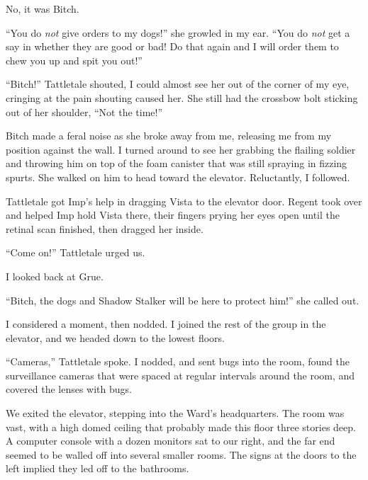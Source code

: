 No, it was Bitch.



``You do \emph{not} give orders to my dogs!'' she growled in my ear.  ``You do \emph{not} get a say in whether they are good or bad!  Do that again and I will order them to chew you up and spit you out!''



``Bitch!'' Tattletale shouted, I could almost see her out of the corner of my eye, cringing at the pain shouting caused her.  She still had the crossbow bolt sticking out of her shoulder, ``Not the time!''



Bitch made a feral noise as she broke away from me, releasing me from my position against the wall.  I turned around to see her grabbing the flailing soldier and throwing him on top of the foam canister that was still spraying in fizzing spurts.  She walked on him to head toward the elevator.  Reluctantly, I followed.



Tattletale got Imp's help in dragging Vista to the elevator door.  Regent took over and helped Imp hold Vista there, their fingers prying her eyes open until the retinal scan finished, then dragged her inside.



``Come on!'' Tattletale urged us.



I looked back at Grue.



``Bitch, the dogs and Shadow Stalker will be here to protect him!'' she called out.



I considered a moment, then nodded.  I joined the rest of the group in the elevator, and we headed down to the lowest floors.



``Cameras,'' Tattletale spoke.  I nodded, and sent bugs into the room, found the surveillance cameras that were spaced at regular intervals around the room, and covered the lenses with bugs.



We exited the elevator, stepping into the Ward's headquarters.  The room was vast, with a high domed ceiling that probably made this floor three stories deep.  A computer console with a dozen monitors sat to our right, and the far end seemed to be walled off into several smaller rooms.  The signs at the doors to the left implied they led off to the bathrooms.



